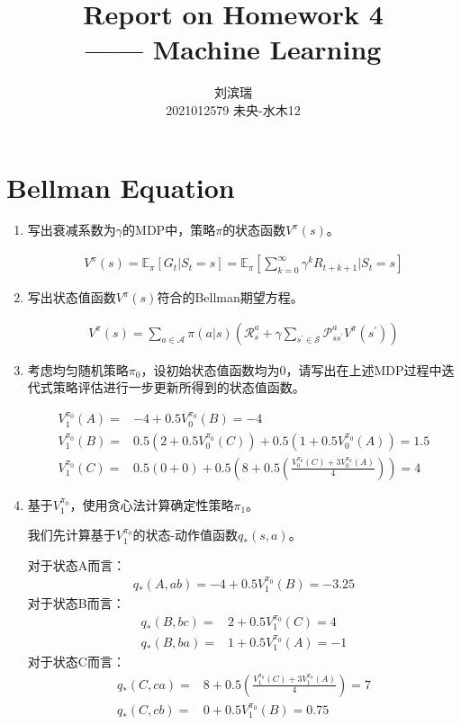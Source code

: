 \documentclass[12pt, a4paper]{article}
\title{{\Huge{\textbf{Report on Homework 4 \\}}} —— Machine Learning}
\author{刘滨瑞 \\ 2021012579 \quad 未央-水木12}
\newcommand{\As}{{\mathcal{A}}}
\newcommand{\Ss}{{\mathcal{S}}}
\newcommand{\Ps}{{\mathcal{P}}}
\newcommand{\Rs}{{\mathcal{R}}}
\newcommand{\expect}{{\mathbb{E}}}
\begin{document}
\maketitle


\section{Bellman Equation}

    \begin{enumerate}

    \item 写出衰减系数为$\gamma$的MDP中，策略$\pi$的状态函数$V^\pi(s)$。

        \begin{align}
        V^\pi(s) = \expect_\pi[G_t \vert S_t = s] = \expect_\pi[\sum_{k = 0}^{\infty} \gamma^k R_{t + k + 1} \vert S_t = s]
        \end{align}

    \item 写出状态值函数$V^\pi(s)$符合的Bellman期望方程。

        \begin{align}
        V^\pi(s) = \sum_{a \in \As} \pi(a \vert s) (\Rs_s^a + \gamma \sum_{s^\prime \in \Ss} \Ps_{s s^\prime}^a V^\pi(s^\prime))
        \end{align}

    \item 考虑均匀随机策略$\pi_0$，设初始状态值函数均为$0$，请写出在上述MDP过程中迭代式策略评估进行一步更新所得到的状态值函数。

        \begin{align*}
        V_1^{\pi_0}(A) =& -4 + 0.5 V_0^{\pi_0}(B) = -4 \\
        V_1^{\pi_0}(B) =& 0.5 (2 + 0.5 V_0^{\pi_0}(C)) + 0.5 (1 + 0.5 V_0^{\pi_0}(A)) = 1.5 \\
        V_1^{\pi_0}(C) =& 0.5 (0 + 0) + 0.5 (8 + 0.5 (\frac{V_0^{\pi_0}(C) + 3 V_0^{\pi_0}(A)}{4})) = 4
        \end{align*}

    \item 基于$V_1^{\pi_0}$，使用贪心法计算确定性策略$\pi_1$。

        我们先计算基于$V_1^{\pi_0}$的状态-动作值函数$q_*(s, a)$。

        对于状态A而言：
        \begin{align*}
        q_*(A, ab) = -4 + 0.5 V_1^{\pi_0}(B) = -3.25
        \end{align*}
        对于状态B而言：
        \begin{align*}
        q_*(B, bc) =& 2 + 0.5 V_1^{\pi_0}(C) = 4 \\
        q_*(B, ba) =& 1 + 0.5 V_1^{\pi_0}(A) = -1
        \end{align*}
        对于状态C而言：
        \begin{align*}
        q_*(C, ca) =& 8 + 0.5 (\frac{V_1^{\pi_0}(C) + 3 V_1^{\pi_0}(A)}{4}) = 7 \\
        q_*(C, cb) =& 0 + 0.5 V_1^{\pi_0}(B) = 0.75
        \end{align*}


\end{enumerate}
\end{document}
